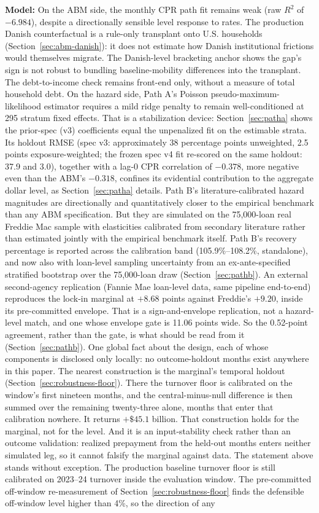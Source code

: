 \documentclass[12pt]{article}
\begin{document}
\textbf{Model:} On the ABM side, the monthly CPR path fit remains weak (raw $R^2$ of $-6.984$), despite a directionally sensible level response to rates. The production Danish counterfactual is a rule-only transplant onto U.S. households (Section~\ref{sec:abm-danish}): it does not estimate how Danish institutional frictions would themselves migrate. The Danish-level bracketing anchor shows the gap's sign is not robust to bundling baseline-mobility differences into the transplant. The debt-to-income check remains front-end only, without a measure of total household debt. On the hazard side, Path A's Poisson pseudo-maximum-likelihood estimator requires a mild ridge penalty to remain well-conditioned at 295 stratum fixed effects. That is a stabilization device: Section~\ref{sec:patha} shows the prior-spec (v3) coefficients equal the unpenalized fit on the estimable strata. Its holdout RMSE (spec v3: approximately 38 percentage points unweighted, 2.5 points exposure-weighted; the frozen spec v4 fit re-scored on the same holdout: 37.9 and 3.0), together with a lag-0 CPR correlation of $-0.378$, more negative even than the ABM's $-0.318$, confines its evidential contribution to the aggregate dollar level, as Section~\ref{sec:patha} details. Path B's literature-calibrated hazard magnitudes are directionally and quantitatively closer to the empirical benchmark than any ABM specification. But they are simulated on the 75,000-loan real Freddie Mac sample with elasticities calibrated from secondary literature rather than estimated jointly with the empirical benchmark itself. Path B's recovery percentage is reported across the calibration band (105.9\%--108.2\%, standalone), and now also with loan-level sampling uncertainty from an ex-ante-specified stratified bootstrap over the 75,000-loan draw (Section~\ref{sec:pathb}). An external second-agency replication (Fannie Mae loan-level data, same pipeline end-to-end) reproduces the lock-in marginal at $+8.68$ points against Freddie's $+9.20$, inside its pre-committed envelope. That is a sign-and-envelope replication, not a hazard-level match, and one whose envelope gate is 11.06 points wide. So the 0.52-point agreement, rather than the gate, is what should be read from it (Section~\ref{sec:pathb}). One global fact about the design, each of whose components is disclosed only locally: no outcome-holdout months exist anywhere in this paper. The nearest construction is the marginal's temporal holdout (Section~\ref{sec:robustness-floor}). There the turnover floor is calibrated on the window's first nineteen months, and the central-minus-null difference is then summed over the remaining twenty-three alone, months that enter that calibration nowhere. It returns $+\$45.1$ billion. That construction holds for the marginal, not for the level. And it is an input-stability check rather than an outcome validation: realized prepayment from the held-out months enters neither simulated leg, so it cannot falsify the marginal against data. The statement above stands without exception. The production baseline turnover floor is still calibrated on 2023--24 turnover inside the evaluation window. The pre-committed off-window re-measurement of Section~\ref{sec:robustness-floor} finds the defensible off-window level higher than 4\%, so the direction of any 
\end{document}

